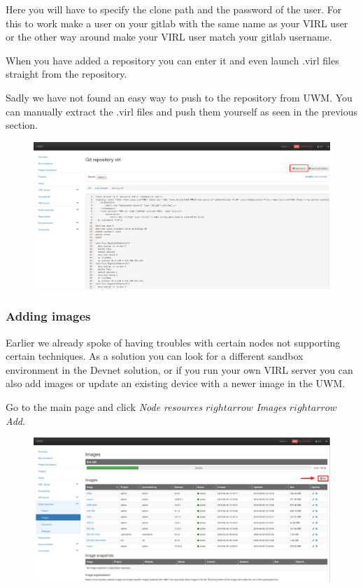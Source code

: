 \documentclass{article}
\begin{document}
Here you will have to specify the clone path and the password of the user.
For this to work make a user on your gitlab with the same name as your VIRL user or the other way around make your VIRL user match your gitlab username.

\newpage
When you have added a repository you can enter it and even launch .virl files straight from the repository.

Sadly we have not found an easy way to push to the repository from UWM.
You can manually extract the .virl files and push them yourself as seen in the previous section.

\begin{figure}[H]
	\centering
	\includegraphics[width=\textwidth]{images/Launch_from_repo.png}
\end{figure}

\subsubsection{Adding images} \label{sec:adding_images}
Earlier we already spoke of having troubles with certain nodes not supporting certain techniques.
As a solution you can look for a different sandbox environment in the Devnet solution,
or if you run your own VIRL server you can also add images or update an existing device with a newer image in the UWM.

Go to the main page and click \textit{Node resources} $rightarrow$ \textit{Images} $rightarrow$ \textit{Add}.

\begin{figure}[H]
	\centering
	\includegraphics[width=\textwidth]{images/Add_images.png}
\end{figure}
\end{document}
